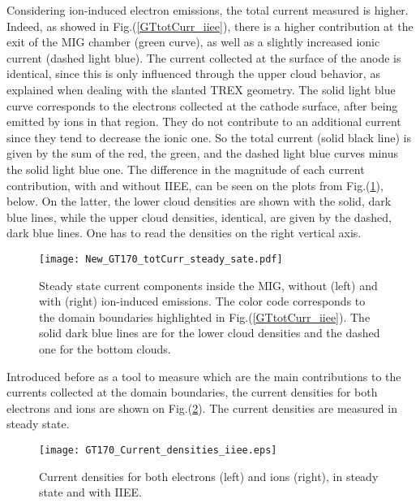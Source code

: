 \noindent Considering ion-induced electron emissions, the total current measured is higher. Indeed, as showed in Fig.(\ref{GTtotCurr_iiee}), there is a higher contribution at the exit of the MIG chamber (green curve), as well as a slightly increased ionic current (dashed light blue). The current collected at the surface of the anode is identical, since this is only influenced through the upper cloud behavior, as explained when dealing with the slanted TREX geometry. The solid light blue curve corresponds to the electrons collected at the cathode surface, after being emitted by ions in that region. They do not contribute to an additional current since they tend to decrease the ionic one. So the total current (solid black line) is given by the sum of the red, the green, and the dashed light blue curves minus the solid light blue one. The difference in the magnitude of each current contribution, with and without IIEE, can be seen on the plots from Fig.(\ref{GTtotCurr_steadyState}), below. On the latter, the lower cloud densities are shown with the solid, dark blue lines, while the upper cloud densities, identical, are given by the dashed, dark blue lines. One has to read the densities on the right vertical axis.\\

\begin{figure}[h!]
\centering
	\texttt{[image: New\_GT170\_totCurr\_steady\_sate.pdf]}
	\caption{\label{GTtotCurr_steadyState} Steady state current components inside the MIG, without (left) and with (right) ion-induced emissions. The color code corresponds to the domain boundaries highlighted in Fig.(\ref{GTtotCurr_iiee}). The solid dark blue lines are for the lower cloud densities and the dashed one for the bottom clouds.}
\end{figure}


\noindent Introduced before as a tool to measure which are the main contributions to the currents collected at the domain boundaries, the current densities for both electrons and ions are shown on Fig.(\ref{GT170_CurrDens}). The current densities are measured in steady state.  

\begin{figure}[h!]
\centering
	\texttt{[image: GT170\_Current\_densities\_iiee.eps]}
	\caption{\label{GT170_CurrDens} Current densities for both electrons (left) and ions (right), in steady state and with IIEE.}
\end{figure}

